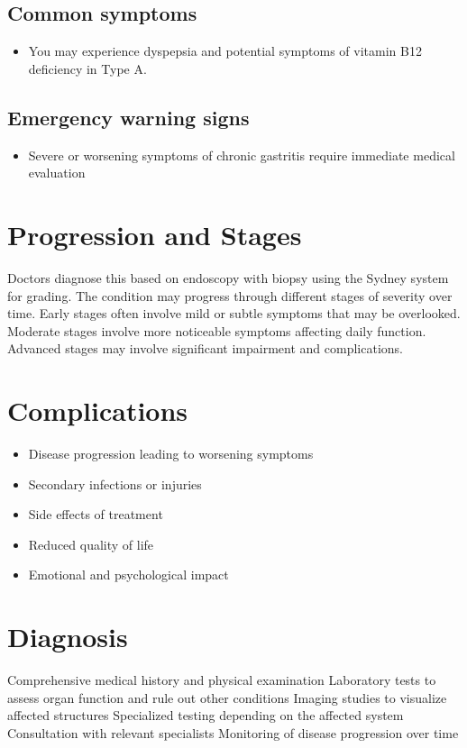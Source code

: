 \subsection{Common symptoms}
\begin{itemize}[noitemsep]
  \item You may experience dyspepsia and potential symptoms of vitamin B12 deficiency in Type A. 
  \end{itemize}

\subsection{Emergency warning signs}
\begin{itemize}[noitemsep]
  \item Severe or worsening symptoms of chronic gastritis require immediate medical evaluation
\end{itemize}
\section{Progression and Stages}
Doctors diagnose this based on endoscopy with biopsy using the Sydney system for grading. The condition may progress through different stages of severity over time. Early stages often involve mild or subtle symptoms that may be overlooked. Moderate stages involve more noticeable symptoms affecting daily function. Advanced stages may involve significant impairment and complications.
\section{Complications}
\begin{itemize}[noitemsep]
  \item Disease progression leading to worsening symptoms
  \item Secondary infections or injuries
  \item Side effects of treatment
  \item Reduced quality of life
  \item Emotional and psychological impact
\end{itemize}
\section{Diagnosis}
Comprehensive medical history and physical examination Laboratory tests to assess organ function and rule out other conditions Imaging studies to visualize affected structures Specialized testing depending on the affected system Consultation with relevant specialists Monitoring of disease progression over time

